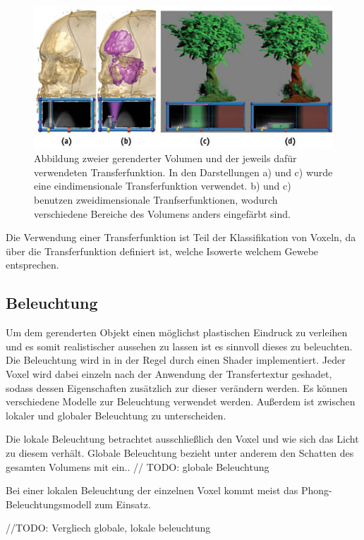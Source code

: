 \begin{figure}
	\centering
	\includegraphics[width=0.7\linewidth]{images/transferfunction.jpg}
	\caption{Abbildung zweier gerenderter Volumen und der jeweils dafür verwendeten Transferfunktion. In den Darstellungen a) und c) wurde eine eindimensionale Transferfunktion verwendet. b) und c) benutzen zweidimensionale Tranfserfunktionen, wodurch verschiedene Bereiche des Volumens anders eingefärbt sind. }
	\label{img:phong}
\end{figure}

Die Verwendung einer Transferfunktion ist Teil der Klassifikation von Voxeln, da über die Transferfunktion definiert ist, welche Isowerte welchem Gewebe entsprechen.

\subsection{Beleuchtung}
\label{beleuchtung}

Um dem gerenderten Objekt einen möglichst plastischen Eindruck zu verleihen und es somit realistischer aussehen zu lassen ist es sinnvoll dieses zu beleuchten. 
Die Beleuchtung wird in in der Regel durch einen Shader implementiert. Jeder Voxel wird dabei einzeln nach der Anwendung der Transfertextur geshadet, sodass dessen Eigenschaften zusätzlich zur dieser verändern werden. Es können verschiedene Modelle zur Beleuchtung verwendet werden. Außerdem ist zwischen lokaler und globaler Beleuchtung zu unterscheiden.


Die lokale Beleuchtung betrachtet ausschließlich den Voxel und wie sich das Licht zu diesem verhält. 
Globale Beleuchtung bezieht unter anderem den Schatten des gesamten Volumens mit ein..
// TODO:
globale Beleuchtung

Bei einer lokalen Beleuchtung der einzelnen Voxel kommt meist das Phong-Beleuchtungsmodell zum Einsatz. 

//TODO: Vergliech globale, lokale beleuchtung

